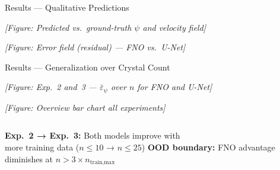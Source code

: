 \documentclass[aspectratio=169, 10pt]{beamer}
\begin{document}
\begin{frame}{Results — Qualitative Predictions}
  \begin{center}
    \textit{[Figure: Predicted vs.\ ground-truth $\psi$ and velocity field]}

    \vspace{0.5em}

    \vspace{1em}
    \textit{[Figure: Error field (residual) — FNO vs.\ U-Net]}
  \end{center}
\end{frame}

\begin{frame}{Results — Generalization over Crystal Count}
  \begin{center}
    \textit{[Figure: Exp.~2 and~3 — $\bar{\varepsilon}_\psi$ over $n$ for FNO and U-Net]}


    \vspace{0.5em}
    \textit{[Figure: Overview bar chart all experiments]}
  \end{center}

  \begin{columns}[T]
      \textbf{Exp.~2 → Exp.~3:} Both models improve with\\
      more training data ($n\leq10$ → $n\leq25$)
      \textbf{OOD boundary:} FNO advantage diminishes at $n > 3\times n_\text{train,max}$
  \end{columns}
\end{frame}
\end{document}
